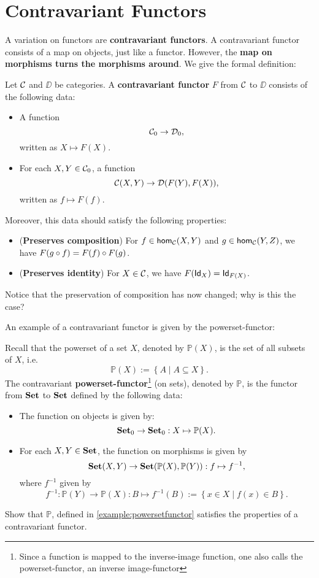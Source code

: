 \section{Contravariant Functors}

A variation on functors are \textbf{contravariant functors}.
A contravariant functor consists of a map on objects, just like a functor.
However, the \textbf{map on morphisms turns the morphisms around}.
We give the formal definition:

\begin{dfn} Let $\CC$ and $\DD$ be categories. A \textbf{contravariant functor} $F$ from $\CC$ to $\DD$ consists of the following data:
\begin{itemize}
\item A function 
\[
\Ob{\CC} \to \Ob{\DD},
\]
written as $X\mapsto F(X)$.
\item For each $X,Y\in \Ob{\CC}$, a function
\[
\CHom{\CC}{X}{Y} \to \CHom{\DD}{F(Y)}{F(X)},
\]
written as $f\mapsto F(f)$.
\end{itemize}
Moreover, this data should satisfy the following properties:
\begin{itemize}
\item (\textbf{Preserves composition}) For $f\in \Hom[\CC]{X}{Y}$ and $g\in \Hom[\CC]{Y}{Z}$, we have $F(\co f g) =  \co {F(g)}{F(f)}$.
\item (\textbf{Preserves identity}) For $X\in\CC$, we have $F(\Id[X]) = \Id[F(X)]$.
\end{itemize}
\end{dfn}

\begin{exer} Notice that the preservation of composition has now changed; why is this the case?
\end{exer}

An example of a contravariant functor is given by the powerset-functor:
\begin{exa} \label{example:powersetfunctor} Recall that the powerset of a set $X$, denoted by $\mathbb{P}(X)$, is the set of all subsets of $X$, i.e. 
\[
\mathbb{P}(X) :=  \left\{A \mid A\subseteq X\right\}.
\]
The contravariant \textbf{powerset-functor}\footnote{Since a function is mapped to the inverse-image function, one also calls the powerset-functor, an inverse image-functor} (on sets), denoted by $\mathbb{P}$, is the functor from $\SET$ to $\SET$ defined by the following data:
\begin{itemize}
\item The function on objects is given by:
\[
\Ob{\SET}\to \Ob{\SET}: X\mapsto \mathbb{P}(X).
\]
\item For each $X,Y\in\SET$, the function on morphisms is given by
\[
\CHom{\SET}{X}{Y} \to \CHom{\SET}{\mathbb{P}(X)}{\mathbb{P}(Y)}: f\mapsto f^{-1},
\]
where $f^{-1}$ given by
\[
f^{-1}:\mathbb{P}(Y)\to \mathbb{P}(X): B\mapsto f^{-1}(B) := \left\{x\in X \mid f(x)\in B\right\}.
\]
\end{itemize}
\end{exa}

\begin{exer} Show that $\mathbb{P}$, defined in \cref{example:powersetfunctor} satisfies the properties of a contravariant functor.
\end{exer}



